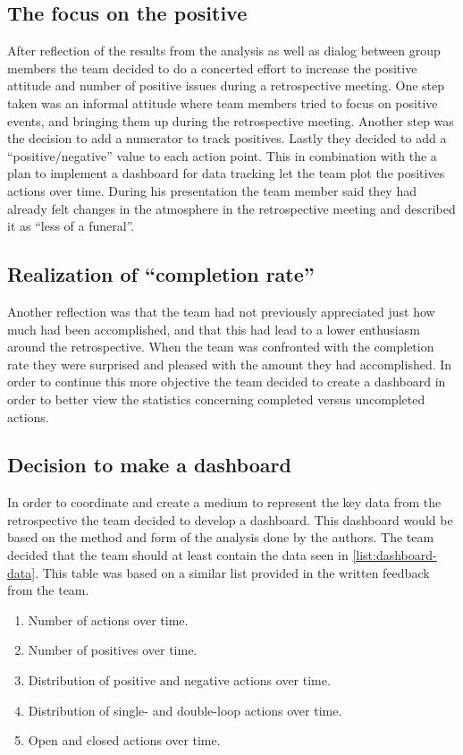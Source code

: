 \subsection{The focus on the positive}
After reflection of the results from the analysis as well as dialog between group members the team decided to do a concerted effort to increase the positive attitude and number of positive issues during a retrospective meeting. One step taken was an informal attitude where team members tried to focus on positive events, and bringing them up during the retrospective meeting. Another step was the decision to add a numerator to track positives. Lastly they decided to add a ``positive/negative'' value to each action point. This in combination with the a plan to implement a dashboard for data tracking let the team plot the positives actions over time. During his presentation the team member said they had already felt changes in the atmosphere in the retrospective meeting and described it as ``less of a funeral''. 

\subsection{Realization of ``completion rate''}
Another reflection was that the team had not previously appreciated just how much had been accomplished, and that this had lead to a lower enthusiasm around the retrospective. When the team was confronted with the completion rate they were surprised and pleased with the amount they had accomplished. In order to continue this more objective the team decided to create a dashboard in order to better view the statistics concerning completed versus uncompleted actions. 

\subsection{Decision to make a dashboard}
In order to coordinate and create a medium to represent the key data from the retrospective the team decided to develop a dashboard. This dashboard would be based on the method and form of the analysis done by the authors.  The team decided that the team should at least contain the data seen in \autoref{list:dashboard-data}. This table was based on a similar list provided in the written feedback from the team. 

\begin{enumerate}
\label{list:dashboard-data}
\item Number of actions over time.
\item Number of positives over time.
\item Distribution of positive and negative actions over time.
\item Distribution of single- and double-loop actions over time.
\item Open and closed actions over time.
\end{enumerate}


